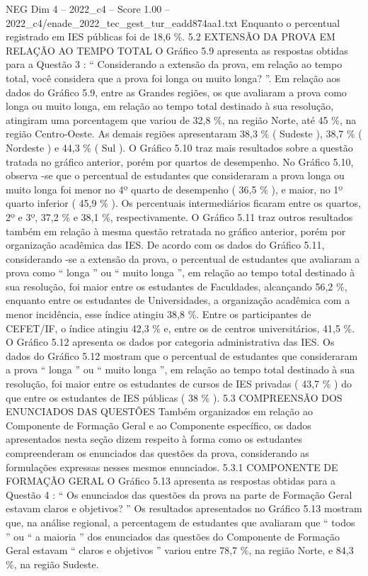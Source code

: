 \begin{textsample}{NEG Dim 4 – 2022\_c4 – Score 1.00 – 2022\_c4/enade\_2022\_tec\_gest\_tur\_eadd874aa1.txt}
Enquanto o percentual registrado em IES públicas foi de 18,6 \%. 5.2 EXTENSÃO DA PROVA EM RELAÇÃO AO TEMPO TOTAL O Gráfico 5.9 apresenta as respostas obtidas para a Questão 3 : “ Considerando a extensão da prova, em relação ao tempo total, você considera que a prova foi longa ou muito longa? ”.
Em relação aos dados do Gráfico 5.9, entre as Grandes regiões, os que avaliaram a prova como longa ou muito longa, em relação ao tempo total destinado à sua resolução, atingiram uma porcentagem que variou de 32,8 \%, na região Norte, até 45 \%, na região Centro-Oeste.
As demais regiões apresentaram 38,3 \% ( Sudeste ), 38,7 \% ( Nordeste ) e 44,3 \% ( Sul ).
O Gráfico 5.10 traz mais resultados sobre a questão tratada no gráfico anterior, porém por quartos de desempenho.
No Gráfico 5.10, observa -se que o percentual de estudantes que consideraram a prova longa ou muito longa foi menor no 4º quarto de desempenho ( 36,5 \% ), e maior, no 1º quarto inferior ( 45,9 \% ).
Os percentuais intermediários ficaram entre os quartos, 2º e 3º, 37,2 \% e 38,1 \%, respectivamente.
O Gráfico 5.11 traz outros resultados também em relação à mesma questão retratada no gráfico anterior, porém por organização acadêmica das IES.
De acordo com os dados do Gráfico 5.11, considerando -se a extensão da prova, o percentual de estudantes que avaliaram a prova como “ longa ” ou “ muito longa ”, em relação ao tempo total destinado à sua resolução, foi maior entre os estudantes de Faculdades, alcançando 56,2 \%, enquanto entre os estudantes de Universidades, a organização acadêmica com a menor incidência, esse índice atingiu 38,8 \%.
Entre os participantes de CEFET/IF, o índice atingiu 42,3 \% e, entre os de centros universitários, 41,5 \%.
O Gráfico 5.12 apresenta os dados por categoria administrativa das IES.
Os dados do Gráfico 5.12 mostram que o percentual de estudantes que consideraram a prova “ longa ” ou “ muito longa ”, em relação ao tempo total destinado à sua resolução, foi maior entre os estudantes de cursos de IES privadas ( 43,7 \% ) do que entre os estudantes de IES públicas ( 38 \% ). 5.3 COMPREENSÃO DOS ENUNCIADOS DAS QUESTÕES Também organizados em relação ao Componente de Formação Geral e ao Componente específico, os dados apresentados nesta seção dizem respeito à forma como os estudantes compreenderam os enunciados das questões da prova, considerando as formulações expressas nesses mesmos enunciados. 5.3.1 COMPONENTE DE FORMAÇÃO GERAL O Gráfico 5.13 apresenta as respostas obtidas para a Questão 4 : “ Os enunciados das questões da prova na parte de Formação Geral estavam claros e objetivos? ” Os resultados apresentados no Gráfico 5.13 mostram que, na análise regional, a percentagem de estudantes que avaliaram que “ todos ” ou “ a maioria ” dos enunciados das questões do Componente de Formação Geral estavam “ claros e objetivos ” variou entre 78,7 \%, na região Norte, e 84,3 \%, na região Sudeste.

\end{textsample}
